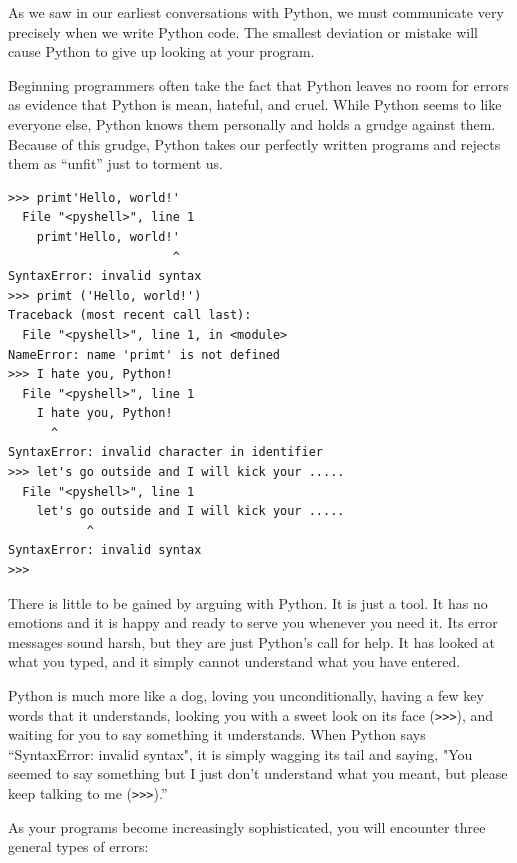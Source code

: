 As we saw in our earliest conversations with Python, we must communicate very precisely when we write Python code. The smallest deviation or mistake will cause Python to give up looking at your program.

Beginning programmers often take the fact that Python leaves no room for errors as evidence that Python is mean, hateful, and cruel. While Python seems to like everyone else, Python knows them personally and holds a grudge against them. Because of this grudge, Python takes our perfectly written programs and rejects them as ``unfit'' just to torment us.

\begin{Verbatim}[frame=single]
>>> primt'Hello, world!'
  File "<pyshell>", line 1
    primt'Hello, world!'
                       ^
SyntaxError: invalid syntax
>>> primt ('Hello, world!')
Traceback (most recent call last):
  File "<pyshell>", line 1, in <module>
NameError: name 'primt' is not defined
>>> I hate you, Python!
  File "<pyshell>", line 1
    I hate you, Python!
      ^
SyntaxError: invalid character in identifier
>>> let's go outside and I will kick your .....
  File "<pyshell>", line 1
    let's go outside and I will kick your .....
           ^
SyntaxError: invalid syntax
>>> 
\end{Verbatim}


There is little to be gained by arguing with Python. It is just a tool. It has no emotions and it is happy and ready to serve you whenever you need it. Its error messages sound harsh, but they are just Python's call for help. It has looked at what you typed, and it simply cannot understand what you have entered.

Python is much more like a dog, loving you unconditionally, having a few key words that it understands, looking you with a sweet look on its face (\texttt{\textgreater{}\textgreater{}\textgreater{}}), and waiting for you to say something it understands. When Python says ``SyntaxError: invalid syntax", it is simply wagging its tail and saying, "You seemed to say something but I just don't understand what you meant, but please keep talking to me
(\texttt{\textgreater{}\textgreater{}\textgreater{}}).''

As your programs become increasingly sophisticated, you will encounter three general types of errors:

